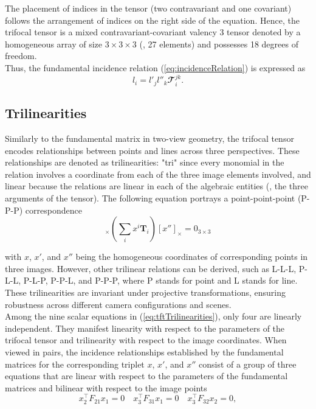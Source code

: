 The placement of indices in the tensor (two contravariant and one covariant) follows the arrangement of indices on the right side of the equation. Hence, the trifocal tensor is a mixed contravariant-covariant valency 3 tensor denoted by a homogeneous array of size \( 3 \times 3 \times 3 \) (\ie, 27 elements) and possesses 18 degrees of freedom.\\

Thus, the fundamental incidence relation (\ref{eq:incidenceRelation}) is expressed as
\begin{equation}
	l_i = l'_jl''_k\mathbfcal{T}_i^{jk}.
	\label{eq:incidenceRelationTensor}
\end{equation}

\subsection{Trilinearities}\label{sec:trilinearities}
Similarly to the fundamental matrix in two-view geometry, the trifocal tensor encodes relationships between points and lines across three perspectives. These relationships are denoted as trilinearities: "tri" since every monomial in the relation involves a coordinate from each of the three image elements involved, and linear because the relations are linear in each of the algebraic entities (\ie, the three arguments of the tensor). The following equation portrays a point-point-point (P-P-P) correspondence 
\begin{equation}
	[x']_{\times} \left( \sum_{i}x^i\bm{T}_i \right) [x'']_{\times} = 0_{3 \times 3}
	\label{eq:tftTrilinearities}
\end{equation}

with \( x \), \( x' \), and \( x'' \) being the homogeneous coordinates of corresponding points in three images. However, other trilinear relations can be derived, such as L-L-L, P-L-L, P-L-P, P-P-L, and P-P-P, where P stands for point and L stands for line. These trilinearities are invariant under projective transformations, ensuring robustness across different camera configurations and scenes.\\

Among the nine scalar equations in (\ref{eq:tftTrilinearities}), only four are linearly independent. They manifest linearity with respect to the parameters of the trifocal tensor and trilinearity with respect to the image coordinates. When viewed in pairs, the incidence relationships established by the fundamental matrices for the corresponding triplet \( x \), \( x' \), and \( x'' \) consist of a group of three equations that are linear with respect to the parameters of the fundamental matrices and bilinear with respect to the image points
\begin{equation}
	x_2^\top F_{21}x_1 = 0 \quad x_3^\top F_{31}x_1 = 0 \quad x_3^\top F_{32}x_2 = 0,
\end{equation}


